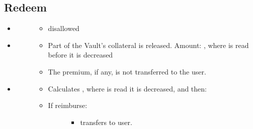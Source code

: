 \documentclass[a4paper,10pt,english]{sphinxmanual}
\begin{document}
\subsection{Redeem}
\label{\detokenize{security_performance/liquidations:redeem}}\begin{itemize}
\item {} \begin{description}
\item[{}] \leavevmode\begin{itemize}
\item {} 
disallowed

\end{itemize}

\end{description}

\item {} \begin{description}
\item[{}] \leavevmode\begin{itemize}
\item {} 
Part of the Vault’s collateral is released. Amount: , where  is read before it is decreased

\item {} 
The premium, if any, is not transferred to the user.

\end{itemize}

\end{description}

\item {} \begin{description}
\item[{}] \leavevmode\begin{itemize}
\item {} 
Calculates ,  where  is read  it is decreased, and then:

\item {} \begin{description}
\item[{If reimburse:}] \leavevmode\begin{itemize}
\item {} 
transfers  to user.


\end{itemize}
\end{description}
\end{itemize}
\end{description}
\end{itemize}
\end{document}

